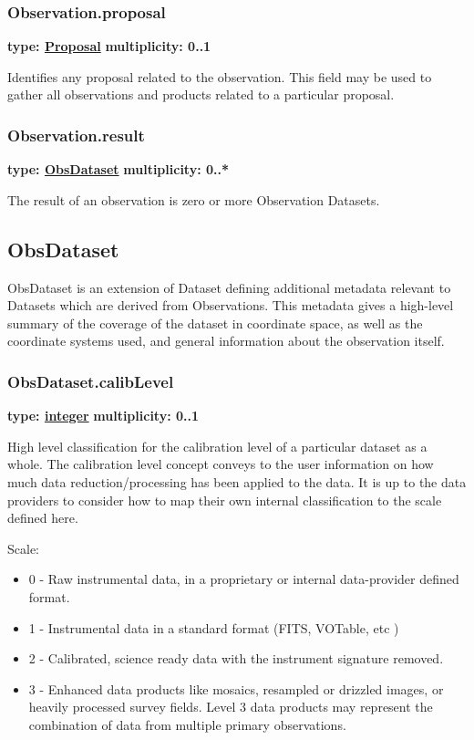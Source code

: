   \subsubsection{Observation.proposal}
  \textbf{type: \hyperref[sect:proposal]{Proposal}} \newline
  \textbf{multiplicity: 0..1} \newline

  Identifies any proposal related to the observation. This field may be used
  to gather all observations and products related to a particular proposal.
  
  \subsubsection{Observation.result}
  \textbf{type: \hyperref[sect:obs_ds]{ObsDataset}} \newline
  \textbf{multiplicity: 0..*} \newline

  The result of an observation is zero or more Observation Datasets.
  
  
\subsection{ObsDataset}
\label{sect:obs_ds}

  ObsDataset is an extension of Dataset defining additional metadata relevant to
  Datasets which are derived from Observations. This metadata gives a high-level
  summary of the coverage of the dataset in coordinate space, as well as the
  coordinate systems used, and general information about the observation itself.

  \subsubsection{ObsDataset.calibLevel}
  \textbf{type: \hyperref[sect:ivoa]{integer}} \newline
  \textbf{multiplicity: 0..1} \newline

  High level classification for the calibration level of a particular dataset
  as a whole. The calibration level concept conveys to the user information on
  how much data reduction/processing has been applied to the data. It is up to
  the data providers to consider how to map their own internal classification to
  the scale defined here.
  
  Scale:
  \begin{itemize}
  \item[] 0 - Raw instrumental data, in a proprietary or internal data-provider defined format.
  \item[] 1 - Instrumental data in a standard format (FITS, VOTable, etc )
  \item[] 2 - Calibrated, science ready data with the instrument signature removed.
  \item[] 3 - Enhanced data products like mosaics, resampled or drizzled images,
              or heavily processed survey fields. Level 3 data products may represent the
              combination of data from multiple primary observations.
  \end{itemize}
  
